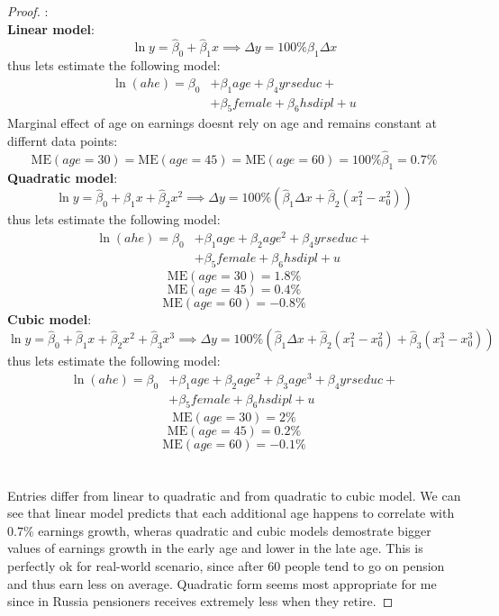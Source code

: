 \documentclass[12pt,reqno]{amsart}
\theoremstyle{plain}
\newcommand{\hb}{\hat\beta}
\begin{document}
\begin{proof}
    :\\
    
    \textbf{Linear model}:
    \[\ln y = \hb_0 + \hb_1 x \implies \Delta y = 100\% \hb_1\Delta x \]
    thus lets estimate the following model:
    \begin{align*}
        \ln(ahe) = \beta_0 & + \beta_1 age + \beta_4 yrseduc  +     \\
                           & + \beta_5 female + \beta_6 hsdipl  + u
    \end{align*}
    Marginal effect of age on earnings doesnt rely on age and remains constant at differnt data points:
    \[ \text{ME}(age=30) = \text{ME}(age=45) = \text{ME}(age=60) = 100\% \hat{\beta}_1 = 0.7\% \]
    \textbf{Quadratic model}:
    \[\ln y = \hb_0 + \hb_1 x + \hb_2 x^{2} \implies \Delta y = 100\%(\hb_1\Delta x + \hb_2 (x_1^{2} - x_0^{2}))  \]
    thus lets estimate the following model:
    \begin{align*}
        \ln(ahe) = \beta_0 & + \beta_1 age + \beta_2 age^{2} + \beta_4 yrseduc  +     \\
                           & + \beta_5 female + \beta_6 hsdipl  + u
    \end{align*}
    \[
    \text{ME}(age=30) = 1.8 \%    
    \]
    \[
    \text{ME}(age=45) = 0.4 \%    
    \]
    \[
    \text{ME}(age=60) = -0.8\%    
    \]
    \textbf{Cubic model}:
    \[\ln y = \hb_0 + \hb_1 x + \hb_2 x^{2} +\hb_3 x^{3}\implies \Delta y = 100\%(\hb_1\Delta x + \hb_2 (x_1^{2} - x_0^{2}) +\hb_3 (x_1^{3} - x_0^{3}))  \]
    thus lets estimate the following model:
    \begin{align*}
        \ln(ahe) = \beta_0 & + \beta_1 age + \beta_2 age^{2} + \beta_{3} age^{3}+ \beta_4 yrseduc  +     \\
                           & + \beta_5 female + \beta_6 hsdipl  + u
    \end{align*}
    \[
    \text{ME}(age=30) = 2\%    
    \]
    \[
    \text{ME}(age=45) = 0.2\%    
    \]
    \[
    \text{ME}(age=60) = -0.1\%    
    \]
    \\\\
    Entries differ from linear to quadratic and from quadratic to cubic model. We can see that linear 
    model predicts that each additional age happens to correlate with $ 0.7\% $ earnings growth, wheras
    quadratic and cubic models demostrate bigger values of earnings growth in the early age and lower 
    in the late age. This is perfectly ok for real-world scenario, since after 60 people tend to go on pension
    and thus earn less on average. Quadratic form seems most appropriate for me since in Russia pensioners
    receives extremely less when they retire.
\end{proof}
\end{document}
